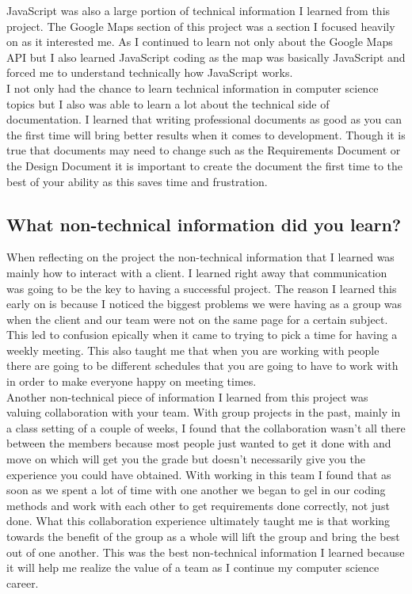 \documentclass[draftclsnofoot,10pt,onecolumn]{IEEEtran} %
\begin{document}
JavaScript was also a large portion of technical information I learned from this
project. The Google Maps section of this project was a section I focused heavily
on as it interested me. As I continued to learn not only about the Google Maps
API but I also learned JavaScript coding as the map was basically JavaScript and
forced me to understand technically how JavaScript works. \\

I not only had the chance to learn technical information in computer science
topics but I also was able to learn a lot about the technical side of
documentation. I learned that writing professional documents as good as you can
the first time will bring better results when it comes to development. Though it
is true that documents may need to change such as the Requirements Document or
the Design Document it is important to create the document the first time to the
best of your ability as this saves time and frustration. 

\subsection{What non-technical information did you learn?}
When reflecting on the project the non-technical information that I learned was
mainly how to interact with a client. I learned right away that communication
was going to be the key to having a successful project. The reason I learned
this early on is because I noticed the biggest problems we were having as a
group was when the client and our team were not on the same page for a certain
subject. This led to confusion epically when it came to trying to pick a time
for having a weekly meeting. This also taught me that when you are working with
people there are going to be different schedules that you are going to have to
work with in order to make everyone happy on meeting times. \\

Another non-technical piece of information I learned from this project was
valuing collaboration with your team. With group projects in the past, mainly in
a class setting of a couple of weeks, I found that the collaboration wasn't all
there between the members because most people just wanted to get it done with
and move on which will get you the grade but doesn't necessarily give you the
experience you could have obtained. With working in this team I found that as
soon as we spent a lot of time with one another we began to gel in our coding
methods and work with each other to get requirements done correctly, not just
done.  What this collaboration experience ultimately taught me is that working
towards the benefit of the group as a whole will lift the group and bring the
best out of one another. This was the best non-technical information I learned
because it will help me realize the value of a team as I continue my computer
science career. 
\end{document}
